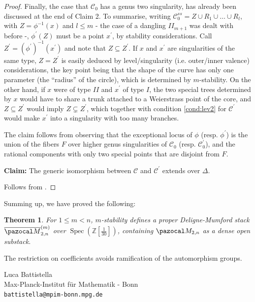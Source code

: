 \documentclass[11pt]{amsart}
\newcommand{\oM}{\overline{\pazocal M}}
\newcommand{\dvr}{\Delta}
\theoremstyle{plain}
\newtheorem{thm}{Theorem}[section]
\theoremstyle{definition}
\begin{document}
\begin{proof}
 Finally, the case that $\mathcal C_0$ has a genus two singularity, has already been discussed at the end of Claim 2. To summarise, writing $\mathcal C^{ss}_0=Z\cup R_1\cup\ldots\cup R_l$, with $Z=\phi^{-1}(x)$ and $l\leq m$ - the case of a dangling $I\!I_{m+1}$ was dealt with before -, $\phi^\prime(Z)$ must be a point $x^\prime$, by stability considerations. Call $Z^\prime=(\phi^\prime)^{-1}(x^\prime)$ and note that $Z\subseteq Z^\prime$. If $x$ and $x^\prime$ are singularities of the same type, $Z=Z^\prime$ is easily deduced by level/singularity (i.e. outer/inner valence) considerations, the key point being that the shape of the curve has only one parameter (the ``radius'' of the circle), which is determined by $m$-stability. On the other hand, if $x$ were of type $I\!I$ and $x^\prime$ of type $I$, the two special trees determined by $x$ would have to share a trunk attached to a Weierstrass point of the core, and $Z\subseteq Z^\prime$ would imply $Z\subsetneq Z^\prime$, which together with condition \eqref{cond:lev2} for $\mathcal C^\prime$ would make $x^\prime$ into a singularity with too many branches.
 
 The claim follows from observing that the exceptional locus of $\phi$ (resp. $\phi^\prime$) is the union of the fibers $F$ over higher genus singularities of $\mathcal C_0$ (resp. $\mathcal C_0^\prime$), and the rational components with only two special points that are disjoint from $F$.
 
 \textbf{Claim:} The generic isomorphism between $\mathcal C$ and $\mathcal C^\prime$ extends over $\dvr$.
 
 Follows from \cite[Lemma 1.13]{Debarre}.
\end{proof}

Summing up, we have proved the following:
\begin{thm}
 For $1\leq m <n$, $m$-stability defines a proper Deligne-Mumford stack $\oM_{2,n}^{(m)}$ over $\operatorname{Spec}(\mathbb Z[\frac{1}{30}])$, containing $\pazocal M_{2,n}$ as a dense open substack.
\end{thm}
 The restriction on coefficients avoids ramification of the automorphism groups.






\medskip

\noindent Luca Battistella\\
Max-Planck-Institut f\"ur Mathematik - Bonn \\
\texttt{battistella@mpim-bonn.mpg.de}\\
\end{document}
